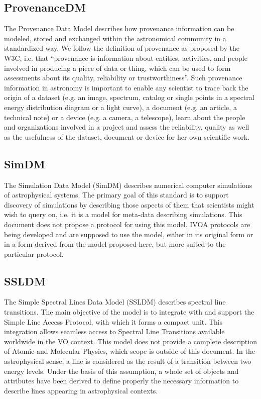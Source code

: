 \documentclass[11pt,a4paper]{ivoa}
\begin{document}
\subsection{ProvenanceDM}

The Provenance Data Model \citep{2020ivoa.spec.0411S} describes how provenance information can be modeled, stored 
and exchanged within the astronomical community in a standardized way. We follow the 
definition of provenance as proposed by the W3C, i.e. that ``provenance is information 
about entities, activities, and people involved in producing a piece of data or thing, 
which can be used to form assessments about its quality, reliability or trustworthiness''.
Such provenance information in astronomy is important to enable any scientist to trace 
back the origin of a dataset (e.g. an image, spectrum, catalog or single points in a 
spectral energy distribution diagram or a light curve), a document (e.g. an article, a 
technical note) or a device (e.g. a camera, a telescope), learn about the people and 
organizations involved in a project and assess the reliability, quality as well as the 
usefulness of the dataset, document or device for her own scientific work. 

\subsection{SimDM}

The Simulation Data Model (SimDM) \citep{2012ivoa.spec.0503L} describes numerical computer simulations of astrophysical systems. 
The primary goal of this standard is to support discovery of simulations by describing those 
aspects of them that scientists might wish to query on, i.e. it is a model for meta-data 
describing simulations. This document does not propose a protocol for using this model. 
IVOA protocols are being developed and are supposed to use the model, either in its original 
form or in a form derived from the model proposed here, but more suited to the particular protocol. 

\subsection{SSLDM}

The Simple Spectral Lines Data Model (SSLDM) \citep{2010ivoa.spec.1209O} describes spectral line transitions. The main objective of 
the model is to integrate with and support the Simple Line Access Protocol, with which it forms 
a compact unit. This integration allows seamless access to Spectral Line Transitions available 
worldwide in the VO context. This model does not provide a complete description of Atomic and 
Molecular Physics, which scope is outside of this document. In the astrophysical sense, a line 
is considered as the result of a transition between two energy levels. Under the basis of this 
assumption, a whole set of objects and attributes have been derived to define properly the 
necessary information to describe lines appearing in astrophysical contexts.
\end{document}
